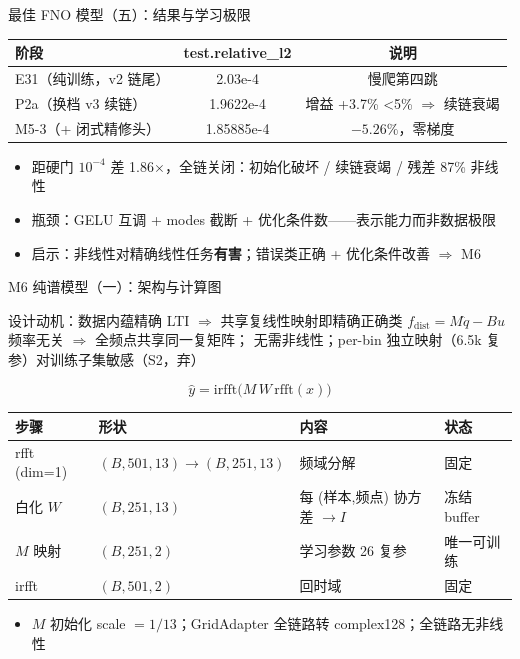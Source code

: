 \documentclass[aspectratio=169]{beamer}
\newcommand{\pos}[1]{\textcolor{blue!70!black}{#1}}
\newcommand{\con}[1]{\textcolor{orange!85!black}{#1}}
\newcommand{\HL}[1]{\textcolor{green!45!black}{#1}}
\begin{document}
\begin{frame}{最佳 FNO 模型（五）：结果与学习极限}
  \begin{table}
    \centering
    \begin{tabular}{lcc}
      \toprule
      阶段 & test.relative\_l2 & 说明 \\
      \midrule
      E31（纯训练，v2 链尾） & 2.03e-4 & 慢爬第四跳 \\
      P2a（换档 v3 续链） & 1.9622e-4 & 增益 +3.7\% <5\% $\Rightarrow$ 续链衰竭 \\
      \HL{M5-3（+ 闭式精修头）} & \HL{1.85885e-4} & $-5.26\%$，零梯度 \\
      \bottomrule
    \end{tabular}
  \end{table}
  \begin{itemize}
    \item 距硬门 $10^{-4}$ 差 \con{1.86$\times$}，全链关闭：初始化破坏 / 续链衰竭 / 残差 87\% 非线性
    \item 瓶颈：\con{GELU 互调 + modes 截断 + 优化条件数}——表示能力而非数据极限
    \item 启示：非线性对精确线性任务\textbf{有害}；错误类正确 + 优化条件改善 $\Rightarrow$ M6
  \end{itemize}
\end{frame}

\begin{frame}{M6 纯谱模型（一）：架构与计算图}
  \begin{block}{设计动机：数据内蕴精确 LTI $\Rightarrow$ 共享复线性映射即精确正确类}
    $f_{\mathrm{dist}} = M\ddot{q} - Bu$ 频率无关 $\Rightarrow$ 全频点共享同一复矩阵；
    \pos{无需非线性}；per-bin 独立映射（6.5k 复参）对训练子集敏感（S2，弃）
  \end{block}
  \begin{equation*}
    \hat{y} = \mathrm{irfft}\big(M \, W \, \mathrm{rfft}(x)\big)
  \end{equation*}
  \begin{table}
    \centering
    \small
    \begin{tabular}{llll}
      \toprule
      步骤 & 形状 & 内容 & 状态 \\
      \midrule
      rfft (dim=1) & $(B,501,13) \to (B,251,13)$ & 频域分解 & 固定 \\
      白化 $W$ & $(B,251,13)$ & 每 (样本,频点) 协方差 $\to I$ & \pos{冻结 buffer} \\
      $M$ 映射 & $(B,251,2)$ & 学习参数 \pos{26 复参} & \HL{唯一可训练} \\
      irfft & $(B,501,2)$ & 回时域 & 固定 \\
      \bottomrule
    \end{tabular}
  \end{table}
  \begin{itemize}
    \item $M$ 初始化 scale $=1/13$；GridAdapter 全链路转 \pos{complex128}；全链路无非线性
  \end{itemize}
\end{frame}
\end{document}

